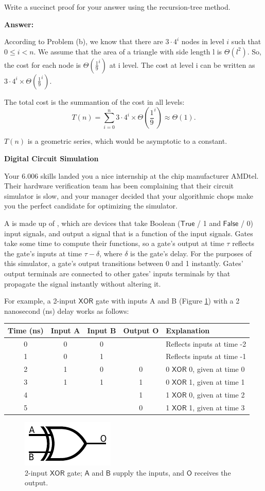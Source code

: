 \documentclass[12pt,twoside]{article}
\newcommand{\answer}{
 \par\medskip
 \textbf{Answer:}
}
\newcommand{\answerIu}{ \answer

{\color{blue}According to Problem (b), we know that there are $3 \cdot 4^i $ nodes in level $i$
such that $0 \le i < n$.  We assume that the area of a triangle with side length l is $\Theta(l^2)$.
So, the cost for each node is $\Theta(\frac{1}{9}^i)$ at i level. The cost 
at level i can be written as $3 \cdot 4^i \times \Theta(\frac{1}{9}^i) $.

The total cost is the summantion of the cost in all levels: 
\begin{equation}
  T(n)=\sum^{n}_{i=0} 3 \cdot 4^i \times \Theta(\frac{1}{9}^i)\approx \Theta(1). 
\end{equation}

$T(n)$ is a geometric series, which would be asymptotic to a constant.}
}
\begin{document}
\begin{problems}
\begin{problemparts}
  \problempart {} Write a succinct proof for your answer using the  
  recursion-tree method.
  \answerIu
\end{problemparts}



\problem {} \textbf{Digital Circuit Simulation}

Your 6.006 skills landed you a nice internship at the chip manufacturer AMDtel.
Their hardware verification team has been complaining that their circuit
simulator is slow, and your manager decided that your algorithmic chops make
you the perfect candidate for optimizing the simulator.

A  is made up of , which are devices that take Boolean
($\mathsf{True}$ / 1 and $\mathsf{False}$ / 0) input signals, and output a
signal that is a function of the input signals. Gates take some time to compute
their functions, so a gate's output at time $\tau$ reflects the gate's inputs at
time $\tau - \delta$, where $\delta$ is the gate's delay. For the purposes of
this simulator, a gate's output transitions between 0 and 1 instantly. Gates'
output terminals are connected to other gates' inputs terminals by 
that propagate the signal instantly without altering it.

For example, a 2-input $\mathsf{XOR}$ gate with inputs A and B (Figure
\ref{fig:xor}) with a 2 nanosecond (ns) delay works as follows: 

\begin{center}
\begin{tabular}{|c|c|c|c|l|}
\hline
Time (ns) & Input A & Input B & Output O & Explanation \\
\hline
0 & 0 & 0 &   & Reflects inputs at time -2 \\ 
1 & 0 & 1 &   & Reflects inputs at time -1 \\ 
2 & 1 & 0 & 0 & 0 $\mathsf{XOR}$ 0, given at time 0 \\
3 & 1 & 1 & 1 & 0 $\mathsf{XOR}$ 1, given at time 1 \\
4 &   &   & 1 & 1 $\mathsf{XOR}$ 0, given at time 2 \\
5 &   &   & 0 & 1 $\mathsf{XOR}$ 1, given at time 3 \\
\hline
\end{tabular}
\end{center}

\begin{figure}[htbp]
\centering
\includegraphics{figures/xor-ansi}
\caption{2-input $\mathsf{XOR}$ gate; $\mathsf{A}$ and $\mathsf{B}$ supply the
inputs, and $\mathsf{O}$ receives the output.}
\label{fig:xor}
\end{figure}  


\end{problems}
\end{document}
